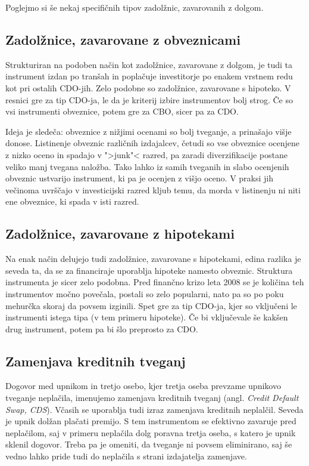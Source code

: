 \documentclass[12pt,a4paper]{amsart}
\theoremstyle{definition} %
\theoremstyle{plain} %
\begin{document}
Poglejmo si še nekaj specifičnih tipov zadolžnic, zavarovanih z dolgom.

\subsection{Zadolžnice, zavarovane z obveznicami}
Strukturiran na podoben način kot zadolžnice, zavarovane z dolgom, je tudi ta 
instrument izdan po tranšah in poplačuje investitorje po enakem vrstnem redu 
kot pri ostalih CDO-jih. Zelo podobne so zadolžnice, zavarovane s hipoteko. V resnici 
gre za tip CDO-ja, le da je kriterij izbire instrumentov bolj strog. Če so vsi instrumenti 
obveznice, potem gre za CBO, sicer pa za CDO.

Ideja je sledeča: obveznice z nižjimi ocenami so bolj tveganje, a prinašajo višje 
donose. Listinenje obveznic različnih izdajalcev, četudi so vse obveznice ocenjene 
z nizko oceno in spadajo v ">junk"< razred, pa zaradi diverzifikacije postane 
veliko manj tvegana naložba. Tako lahko iz samih tveganih in slabo ocenjenih 
obveznic ustvarijo instrument, ki pa je ocenjen z višjo oceno. V praksi jih večinoma 
uvrščajo v investicijski razred kljub temu, da morda v listinenju ni niti ene obveznice, 
ki spada v isti razred.

\subsection{Zadolžnice, zavarovane z hipotekami}
Na enak način delujejo tudi zadolžnice, zavarovane s hipotekami, edina razlika je 
seveda ta, da se za financiraje uporablja hipoteke namesto obveznic. Struktura 
instrumenta je sicer zelo podobna. Pred finančno krizo leta 2008 se je količina 
teh instrumentov močno povečala, postali so zelo popularni, nato pa so po 
poku mehurčka skoraj da povsem izginili. Spet gre za tip CDO-ja, kjer so vključeni 
le instrumenti istega tipa (v tem primeru hipoteke). Če bi vključevale še kakšen 
drug instrument, potem pa bi šlo preprosto za CDO.

\subsection{Zamenjava kreditnih tveganj}
Dogovor med upnikom in tretjo osebo, kjer tretja oseba prevzame upnikovo tveganje 
neplačila, imenujemo zamenjava kreditnih tveganj (angl. \textit{Credit Default Swap, CDS}). 
Včasih se uporablja tudi izraz zamenjava kreditnih neplalčil.
Seveda je upnik dolžan plačati premijo. S tem instrumentom se efektivno zavaruje 
pred neplačilom, saj v primeru neplačila dolg poravna tretja oseba, s katero je upnik 
sklenil dogovor. Treba pa je omeniti, da tveganje ni povsem eliminirano, saj še 
vedno lahko pride tudi do neplačila s strani izdajatelja zamenjave. 
\end{document}
